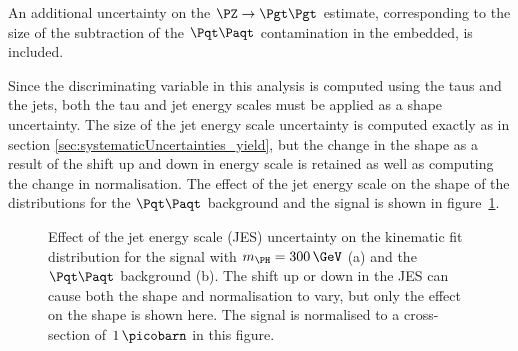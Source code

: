 An additional uncertainty on the $\ZToTauTau$ estimate, corresponding to the
size of the subtraction of the $\ttbar$ contamination in the embedded, is
included. 

Since the discriminating variable in this analysis is computed using the taus
and the jets, both the tau and jet energy scales must be applied as a shape
uncertainty. The size of the jet energy scale uncertainty is computed exactly as
in section \ref{sec:systematicUncertainties_yield}, but the change in the shape
as a result of the shift up and down in energy scale is retained as well as 
computing the change in normalisation. The effect of the jet energy scale
on the shape of the distributions for the $\ttbar$ background and the signal is
shown in figure~\ref{fig:kinfitjes}.

\begin{figure}
\begin{center}

\end{center}
\caption[Effect of the jet energy scale uncertainty on the kinematic fit distribution for
the signal with $m_{\PH}=300\,\GeV$ (a) and the $\ttbar$ background (b).]{
Effect of the jet energy scale (JES) uncertainty on the kinematic fit distribution for
the signal with $m_{\PH}=300\,\GeV$ (a) and the $\ttbar$ background (b).
The shift up or down in the JES can cause both the shape and normalisation to
vary, but only the effect on the shape is shown here. 
The signal is normalised to a cross-section of $1\,\picobarn$ in this figure.}
\label{fig:kinfitjes}
\end{figure} 

